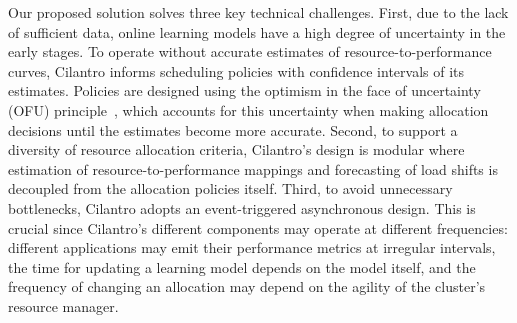 


%
Our proposed solution solves three key technical challenges.
First, due to the lack of
sufficient data, online learning models have a high degree of uncertainty in the early stages.
To operate without accurate estimates of resource-to-performance curves, Cilantro
informs scheduling policies with confidence intervals of its estimates.
Policies are designed using the optimism in the face of uncertainty (OFU)
principle~\citep{bubeck2012regret},
which accounts for this uncertainty when making allocation decisions
until the estimates become more accurate.
Second, to support a diversity of resource allocation criteria,
Cilantro's design is modular where
estimation of resource-to-performance mappings and forecasting of load shifts is decoupled from the
allocation policies itself.
Third,
to avoid unnecessary bottlenecks, Cilantro adopts an event-triggered asynchronous design.
This is crucial since
Cilantro's different components may operate at different frequencies:
different applications may emit their performance metrics at irregular intervals,
the time for updating a learning model depends on the model itself,
and the frequency of changing an allocation may depend on the agility of the cluster's resource
manager.

